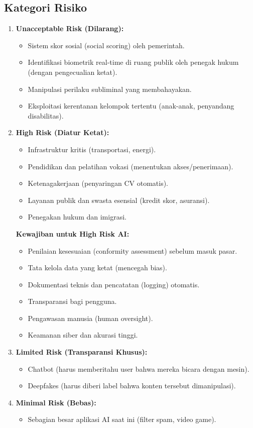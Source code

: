 \subsection{Kategori Risiko}
\begin{enumerate}
    \item \textbf{Unacceptable Risk (Dilarang):}
    \begin{itemize}
        \item Sistem skor sosial (social scoring) oleh pemerintah.
        \item Identifikasi biometrik real-time di ruang publik oleh penegak hukum (dengan pengecualian ketat).
        \item Manipulasi perilaku subliminal yang membahayakan.
        \item Eksploitasi kerentanan kelompok tertentu (anak-anak, penyandang disabilitas).
    \end{itemize}
    \item \textbf{High Risk (Diatur Ketat):}
    \begin{itemize}
        \item Infrastruktur kritis (transportasi, energi).
        \item Pendidikan dan pelatihan vokasi (menentukan akses/penerimaan).
        \item Ketenagakerjaan (penyaringan CV otomatis).
        \item Layanan publik dan swasta esensial (kredit skor, asuransi).
        \item Penegakan hukum dan imigrasi.
    \end{itemize}
    \textbf{Kewajiban untuk High Risk AI:}
    \begin{itemize}
        \item Penilaian kesesuaian (conformity assessment) sebelum masuk pasar.
        \item Tata kelola data yang ketat (mencegah bias).
        \item Dokumentasi teknis dan pencatatan (logging) otomatis.
        \item Transparansi bagi pengguna.
        \item Pengawasan manusia (human oversight).
        \item Keamanan siber dan akurasi tinggi.
    \end{itemize}
    \item \textbf{Limited Risk (Transparansi Khusus):}
    \begin{itemize}
        \item Chatbot (harus memberitahu user bahwa mereka bicara dengan mesin).
        \item Deepfakes (harus diberi label bahwa konten tersebut dimanipulasi).
    \end{itemize}
    \item \textbf{Minimal Risk (Bebas):}
    \begin{itemize}
        \item Sebagian besar aplikasi AI saat ini (filter spam, video game).
    \end{itemize}
\end{enumerate}

